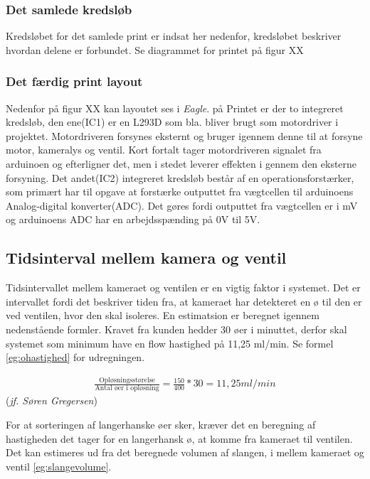 \subsubsection{Det samlede kredsløb}
Kredsløbet for det samlede print er indsat her nedenfor, kredsløbet beskriver hvordan delene er forbundet. 
Se diagrammet for printet på figur XX

\subsubsection{Det færdig print layout}
Nedenfor på figur XX kan layoutet ses i \textit{Eagle}. på Printet er der to integreret kredsløb, den ene(IC1) er en L293D som bla. bliver brugt som motordriver i projektet. Motordriveren forsynes eksternt og bruger igennem denne til at forsyne motor, kameralys og ventil. Kort fortalt tager motordriveren signalet fra arduinoen og efterligner det, men i stedet leverer effekten i gennem den eksterne forsyning. Det andet(IC2) integreret kredsløb består af en operationsforstærker, som primært har til opgave at forstærke outputtet fra vægtcellen til arduinoens Analog-digital konverter(ADC). Det gøres fordi outputtet fra vægtcellen er i mV og arduinoens ADC har en arbejdsspænding på 0V til 5V.  


\subsection{Tidsinterval mellem kamera og ventil}
Tidsintervallet mellem kameraet og ventilen er en vigtig faktor i systemet. Det er   intervallet fordi det beskriver tiden fra, at kameraet har detekteret en ø til den er ved ventilen, hvor den skal isoleres. En estimatsion er beregnet igennem nedenstående formler. Kravet fra kunden hedder 30 øer i minuttet, derfor skal systemet som minimum have en flow hastighed på 11,25 ml/min. Se formel \ref{eg:ohastighed} for udregningen.

\begin{align}
\frac{\text{Opløsningsstørelse}}{\text{Antal øer i opløsning}} = \frac{150}{400}*30 = 11,25ml/min
\label{eg:ohastighed}
\end{align}(\textit{jf. Søren Gregersen})

For at sorteringen af langerhanske øer sker, kræver det en beregning af hastigheden det tager for en langerhansk ø, at komme fra kameraet til ventilen. Det kan estimeres ud fra det beregnede volumen af slangen, i mellem kameraet og ventil \ref{eg:slangevolume}.

